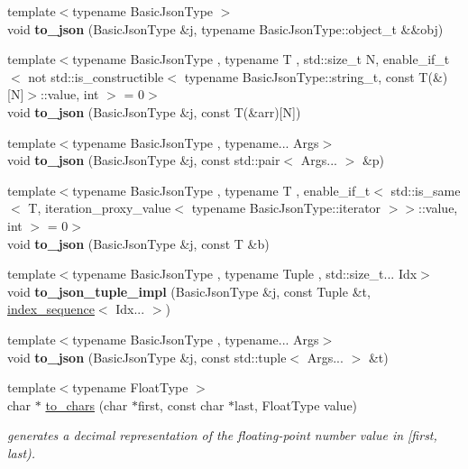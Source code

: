 \begin{DoxyCompactItemize}
{\footnotesize template$<$typename Basic\+Json\+Type $>$ }\\void {\bfseries to\+\_\+json} (Basic\+Json\+Type \&j, typename Basic\+Json\+Type\+::object\+\_\+t \&\&obj)
\item 
\mbox{\label{namespacenlohmann_1_1detail_a20ea5175c8999fc8b673e46b892f71f6}} 
{\footnotesize template$<$typename Basic\+Json\+Type , typename T , std\+::size\+\_\+t N, enable\+\_\+if\+\_\+t$<$ not std\+::is\+\_\+constructible$<$ typename Basic\+Json\+Type\+::string\+\_\+t, const T(\&)\mbox{[}\+N\mbox{]}$>$\+::value, int $>$  = 0$>$ }\\void {\bfseries to\+\_\+json} (Basic\+Json\+Type \&j, const T(\&arr)\mbox{[}N\mbox{]})
\item 
\mbox{\label{namespacenlohmann_1_1detail_aa30611f74062379d3420c40487cf3bb3}} 
{\footnotesize template$<$typename Basic\+Json\+Type , typename... Args$>$ }\\void {\bfseries to\+\_\+json} (Basic\+Json\+Type \&j, const std\+::pair$<$ Args... $>$ \&p)
\item 
\mbox{\label{namespacenlohmann_1_1detail_aaa77b0c9745130b77733a92a1a2e82ec}} 
{\footnotesize template$<$typename Basic\+Json\+Type , typename T , enable\+\_\+if\+\_\+t$<$ std\+::is\+\_\+same$<$ T, iteration\+\_\+proxy\+\_\+value$<$ typename Basic\+Json\+Type\+::iterator $>$$>$\+::value, int $>$  = 0$>$ }\\void {\bfseries to\+\_\+json} (Basic\+Json\+Type \&j, const T \&b)
\item 
\mbox{\label{namespacenlohmann_1_1detail_a510dfa15b01e9a8afe31600a27b28199}} 
{\footnotesize template$<$typename Basic\+Json\+Type , typename Tuple , std\+::size\+\_\+t... Idx$>$ }\\void {\bfseries to\+\_\+json\+\_\+tuple\+\_\+impl} (Basic\+Json\+Type \&j, const Tuple \&t, \hyperlink{structnlohmann_1_1detail_1_1index__sequence}{index\+\_\+sequence}$<$ Idx... $>$)
\item 
\mbox{\label{namespacenlohmann_1_1detail_aa7a47b08eee864c2c108c04954919648}} 
{\footnotesize template$<$typename Basic\+Json\+Type , typename... Args$>$ }\\void {\bfseries to\+\_\+json} (Basic\+Json\+Type \&j, const std\+::tuple$<$ Args... $>$ \&t)
\item 
{\footnotesize template$<$typename Float\+Type $>$ }\\char $\ast$ \hyperlink{namespacenlohmann_1_1detail_a18759c536d89c4dd3a118bd3ecb790da}{to\+\_\+chars} (char $\ast$first, const char $\ast$last, Float\+Type value)
\begin{DoxyCompactList}\small\item\em generates a decimal representation of the floating-\/point number value in \mbox{[}first, last). \end{DoxyCompactList}\end{DoxyCompactItemize}


